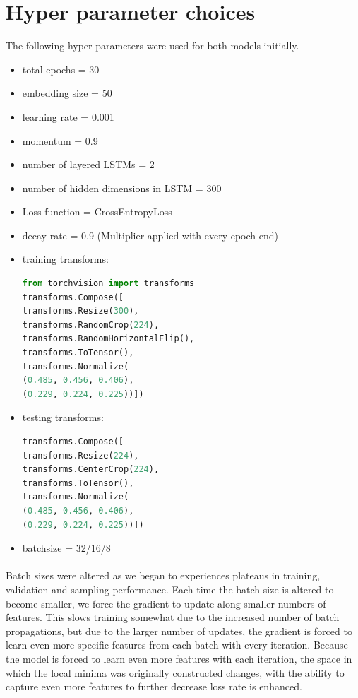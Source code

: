 \documentclass{proc}
\begin{document}
\section{Hyper parameter choices}
The following hyper parameters were used for both models initially.
\begin{itemize}
\item total epochs = 30
\item embedding size = 50 
\item learning rate = 0.001 
\item momentum = 0.9
\item number of layered LSTMs = 2
\item number of hidden dimensions in LSTM = 300
\item Loss function = CrossEntropyLoss
\item decay rate = 0.9 (Multiplier applied with every epoch end)
\item training transforms:
\begin{lstlisting}[language = python]
from torchvision import transforms
transforms.Compose([
transforms.Resize(300), 
transforms.RandomCrop(224), 
transforms.RandomHorizontalFlip(),
transforms.ToTensor(), 
transforms.Normalize(
(0.485, 0.456, 0.406),
(0.229, 0.224, 0.225))])
\end{lstlisting}
\item testing transforms:
\begin{lstlisting}[language = python]
transforms.Compose([ 
transforms.Resize(224),
transforms.CenterCrop(224),
transforms.ToTensor(), 
transforms.Normalize(
(0.485, 0.456, 0.406),  
(0.229, 0.224, 0.225))])
\end{lstlisting}
\item batchsize = 32/16/8
\end{itemize}
\paragraph{} Batch sizes were altered as we began to experiences plateaus in training, validation and sampling performance. Each time the batch size is altered to become smaller, we force the gradient to update along smaller numbers of features. This slows training somewhat due to the increased number of batch propagations, but due to the larger number of updates, the gradient is forced to learn even more specific features from each batch with every iteration. Because the model is forced to learn even more features with each iteration, the space in which the local minima was originally constructed changes, with the ability to capture even more features to further decrease loss rate is enhanced.
\end{document}
